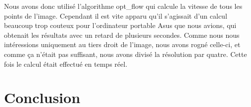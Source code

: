 \documentclass[titlepage,11pt,a4paper]{article}
\begin{document}
Nous avons donc utilisé l'algorithme opt\_flow qui calcule la vitesse de tous les points de l'image. Cependant il est vite apparu qu'il s'agissait d'un calcul beaucoup trop couteux pour l'ordinateur portable Asus que nous avions, qui obtenait les résultats avec un retard de plusieurs secondes. Comme nous nous intéressions uniquement au tiers droit de l'image, nous avons rogné celle-ci, et comme ça n'était pas suffisant, nous avons divisé la résolution par quatre. Cette fois le calcul était effectué en temps réel.

\newpage

\section*{Conclusion}
\end{document}
